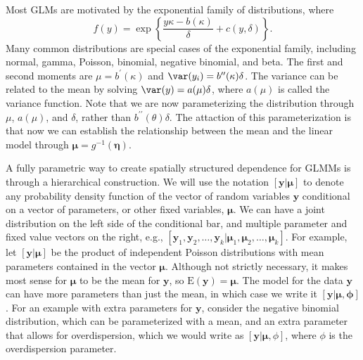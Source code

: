 \documentclass[12pt, titlepage]{article}
\begin{document}
Most GLMs are motivated by the exponential family of distributions, where
$$ f(y) = \exp \left\{ \frac{y\kappa - b(\kappa )}{\delta } + c(y,\delta ) \right\}.
$$
Many common distributions are special cases of the exponential family, including normal, gamma, Poisson, binomial, negative binomial, and beta.  The first and second moments are $\mu = b^{\prime}(\kappa)$ and $\var(y_{i}) = b^{\prime\prime}(\kappa)\delta$.  The variance can be related to the mean by solving $\var(y) = a(\mu)\delta$, where $a(\mu)$ is called the variance function.  Note that we are now parameterizing the distribution through $\mu$, $a(\mu)$, and $\delta$, rather than $b^{\prime\prime}(\theta)\delta$.  The attaction of this parameterization is that now we can establish the relationship between the mean and the linear model through $\boldsymbol{\mu} = g^{-1}(\boldsymbol{\eta})$.

A fully parametric way to create spatially structured dependence for GLMMs is through a hierarchical construction.  We will use the notation $[\mathbf{y}|\boldsymbol{\mu}]$ to denote any probability density function of the vector of random variables $\mathbf{y}$ conditional on a vector of parameters, or other fixed variables, $\boldsymbol{\mu}$. We can have a joint distribution on the left side of the conditional bar, and multiple parameter and fixed value vectors on the right, e.g., $[\mathbf{y}_{1},\mathbf{y}_{2}, \ldots, \mathbf{y}_{k} | \boldsymbol{\mu}_{1}, \boldsymbol{\mu}_{2}, \ldots, \boldsymbol{\mu}_{k}]$. For example, let $[\mathbf{y}|\boldsymbol{\mu}]$ be the product of independent Poisson distributions with mean parameters contained in the vector $\boldsymbol{\mu}$.  Although not strictly necessary, it makes most sense for $\boldsymbol{\mu}$ to be the mean for $\mathbf{y}$, so $\textrm{E}(\mathbf{y}) = \boldsymbol{\mu}$. The model for the data $\mathbf{y}$ can have more parameters than just the mean, in which case we write it $[\mathbf{y}|\boldsymbol{\mu},\boldsymbol{\phi}]$. For an example with extra parameters for $\mathbf{y}$, consider the negative binomial distribution, which can be parameterized with a mean, and an extra parameter that allows for overdispersion, which we would write as $[\mathbf{y}|\boldsymbol{\mu},\phi]$, where $\phi$ is the overdispersion parameter.
\end{document}
